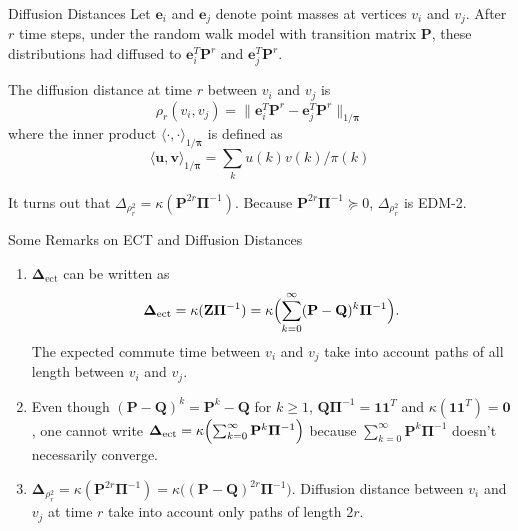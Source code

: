 \documentclass[professionalfonts, hyperref={pdfpagelabels=false,
  colorlinks=true, linkcolor=purple}]{beamer}
\begin{document}
\begin{frame}{Diffusion Distances}
  Let $\bm{e}_i$ and $\bm{e}_j$ denote point masses at vertices $v_i$ and
  $v_j$. After $r$ time steps, under the random walk model with
  transition matrix $\mathbf{P}$, these distributions had diffused to
  $\bm{e}_i^{T} \mathbf{P}^{r}$ and $\bm{e}_j^{T}\mathbf{P}^{r}$. 
  
  \vskip10pt The diffusion distance \cite{coifman06:_diffus_maps} at
  time $r$ between $v_i$ and $v_j$ is
    \begin{equation*}
      \rho_{r}(v_i,v_j) = \| \bm{e}_i^{T} \mathbf{P}^{r} -
      \bm{e}_j^{T}
      \mathbf{P}^{r} \|_{1/\bm{\pi}}
    \end{equation*}
    where the inner product $\langle \cdot, \cdot
    \rangle_{1/\bm{\pi}}$ is defined as
    \begin{equation*}
      \langle \bm{u}, \bm{v} \rangle_{1/\bm{\pi}} = \sum_{k} u(k)
      v(k)/\pi(k)
    \end{equation*}
    
      \vskip10pt
      It turns out that $\Delta_{\rho_{r}^{2}} =
      \kappa(\mathbf{P}^{2r}\bm{\Pi}^{-1})$. 
      Because $\mathbf{P}^{2r}\bm{\Pi}^{-1} \succeq 0$,
      $\Delta_{\rho_{r}^{2}}$ is EDM-2.  
\end{frame}

\begin{frame}{Some Remarks on ECT and Diffusion
  Distances}
  \begin{enumerate}
  \item $\bm{\Delta}_{\mathrm{ect}}$ can be written as
    \begin{equation*}
      \bm{\Delta}_{\mathrm{ect}} = \kappa(\mathbf{Z}\bm{\Pi}^{-1}) =
      \kappa\Bigl( \sum_{k=0}^{\infty}(\mathbf{P} -
      \mathbf{Q})^{k}\bm{\Pi}^{-1}\Bigr).
    \end{equation*}
    The expected commute time between $v_i$ and $v_j$ take into account
    paths of all length between $v_i$ and $v_j$.
  \item Even though $(\mathbf{P} - \mathbf{Q})^{k} =
    \mathbf{P}^{k} - \mathbf{Q}$ for $k \geq 1$,
    $\mathbf{Q}\bm{\Pi}^{-1} = \bm{1}\bm{1}^{T}$ and
    $\kappa(\bm{1}\bm{1}^{T}) = \bm{0}$, one cannot write
    $\bm{\Delta}_{\mathrm{ect}} =
    \kappa\Bigl(\sum_{k=0}^{\infty}\mathbf{P}^{k}\bm{\Pi}^{-1}\Bigr)$
    because $\sum_{k=0}^{\infty}\mathbf{P}^{k}\bm{\Pi}^{-1}$
    doesn't necessarily converge.
  \item $\bm{\Delta}_{\rho_{r}^{2}} =
    \kappa(\mathbf{P}^{2r}\bm{\Pi}^{-1}) = \kappa\bigl((\mathbf{P} -
    \mathbf{Q})^{2r}\bm{\Pi}^{-1}\bigr)$. Diffusion distance between
    $v_i$ and $v_j$ at time $r$ take into account only paths of length
    $2r$.
  \end{enumerate}
\end{frame}
\end{document}
